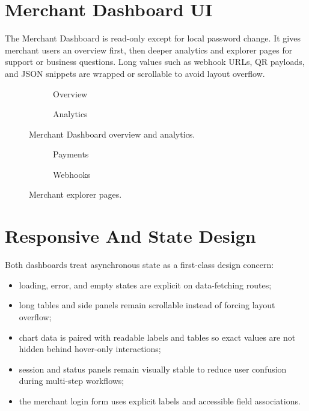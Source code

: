 \section{Merchant Dashboard UI}

The Merchant Dashboard is read-only except for local password change. It gives
merchant users an overview first, then deeper analytics and explorer pages for
support or business questions. Long values such as webhook URLs, QR payloads,
and JSON snippets are wrapped or scrollable to avoid layout overflow.

\begin{figure}[!htbp]
\centering
\begin{subfigure}{0.48\textwidth}
  \centering
  \caption{Overview}
\end{subfigure}
\hfill
\begin{subfigure}{0.48\textwidth}
  \centering
  \caption{Analytics}
\end{subfigure}
\caption{Merchant Dashboard overview and analytics.}
\end{figure}

\begin{figure}[!htbp]
\centering
\begin{subfigure}{0.48\textwidth}
  \centering
  \caption{Payments}
\end{subfigure}
\hfill
\begin{subfigure}{0.48\textwidth}
  \centering
  \caption{Webhooks}
\end{subfigure}
\caption{Merchant explorer pages.}
\end{figure}

\section{Responsive And State Design}

Both dashboards treat asynchronous state as a first-class design concern:

\begin{itemize}
  \item loading, error, and empty states are explicit on data-fetching routes;
  \item long tables and side panels remain scrollable instead of forcing layout
  overflow;
  \item chart data is paired with readable labels and tables so exact values are
  not hidden behind hover-only interactions;
  \item session and status panels remain visually stable to reduce user
  confusion during multi-step workflows;
  \item the merchant login form uses explicit labels and accessible field
  associations.
\end{itemize}

